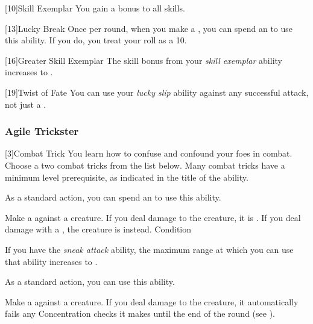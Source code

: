             [10]{Skill Exemplar} You gain a  bonus to all skills.

            [13]{Lucky Break} Once per round, when you make a , you can spend an  to use this ability.
            If you do, you treat your roll as a 10.

            [16]{Greater Skill Exemplar} The skill bonus from your \textit{skill exemplar} ability increases to .

            [19]{Twist of Fate} You can use your \textit{lucky slip} ability against any successful attack, not just a .

        \subsubsection{Agile Trickster}

            [3]{Combat Trick}
            You learn how to confuse and confound your foes in combat.
            Choose a two combat tricks from the list below.
            Many combat tricks have a minimum level prerequisite, as indicated in the title of the ability.

             As a standard action, you can spend an  to use this ability.
            \begin{ability}
                \begin{spelleffects}
                    \spelleffect Make a  against a creature.
                    If you deal damage to the creature, it is \disoriented.
                    If you deal damage with a , the creature is \stunned instead.
                    \spelldur Condition
                \end{spelleffects}
            \end{ability}

             If you have the \textit{sneak attack} ability, the maximum range at which you can use that ability increases to \rnglong.

             As a standard action, you can use this ability.
            \begin{ability}
                \begin{spelleffects}
                    \spelleffect Make a  against a creature.
                    If you deal damage to the creature, it automatically fails any Concentration checks it makes until the end of the round (see ).
                \end{spelleffects}
            \end{ability}

